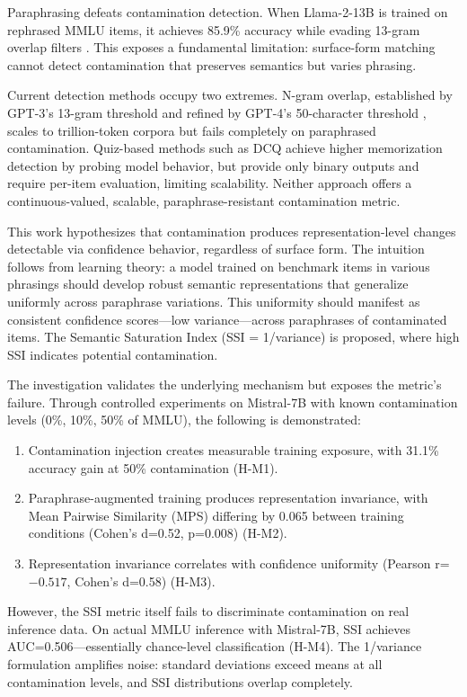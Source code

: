 
Paraphrasing defeats contamination detection. When Llama-2-13B is trained on rephrased MMLU items, it achieves 85.9\% accuracy while evading 13-gram overlap filters \citep{yang2023rethinking}. This exposes a fundamental limitation: surface-form matching cannot detect contamination that preserves semantics but varies phrasing.

Current detection methods occupy two extremes. N-gram overlap, established by GPT-3's 13-gram threshold \citep{brown2020language} and refined by GPT-4's 50-character threshold \citep{openai2023gpt4}, scales to trillion-token corpora but fails completely on paraphrased contamination. Quiz-based methods such as DCQ \citep{golchin2023data} achieve higher memorization detection by probing model behavior, but provide only binary outputs and require per-item evaluation, limiting scalability. Neither approach offers a continuous-valued, scalable, paraphrase-resistant contamination metric.

This work hypothesizes that contamination produces representation-level changes detectable via confidence behavior, regardless of surface form. The intuition follows from learning theory: a model trained on benchmark items in various phrasings should develop robust semantic representations that generalize uniformly across paraphrase variations. This uniformity should manifest as consistent confidence scores---low variance---across paraphrases of contaminated items. The Semantic Saturation Index (SSI = 1/variance) is proposed, where high SSI indicates potential contamination.

The investigation validates the underlying mechanism but exposes the metric's failure. Through controlled experiments on Mistral-7B with known contamination levels (0\%, 10\%, 50\% of MMLU), the following is demonstrated:

\begin{enumerate}
\item Contamination injection creates measurable training exposure, with 31.1\% accuracy gain at 50\% contamination (H-M1).
\item Paraphrase-augmented training produces representation invariance, with Mean Pairwise Similarity (MPS) differing by 0.065 between training conditions (Cohen's d=0.52, p=0.008) (H-M2).
\item Representation invariance correlates with confidence uniformity (Pearson r=$-0.517$, Cohen's d=0.58) (H-M3).
\end{enumerate}

However, the SSI metric itself fails to discriminate contamination on real inference data. On actual MMLU inference with Mistral-7B, SSI achieves AUC=0.506---essentially chance-level classification (H-M4). The 1/variance formulation amplifies noise: standard deviations exceed means at all contamination levels, and SSI distributions overlap completely.

